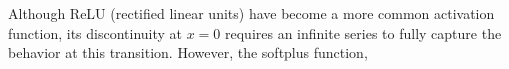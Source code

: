 Although ReLU (rectified linear units) have become a more common activation function, its discontinuity at $x = 0$ requires an infinite series to fully capture the behavior at this transition. However, the softplus function,%
%
%


